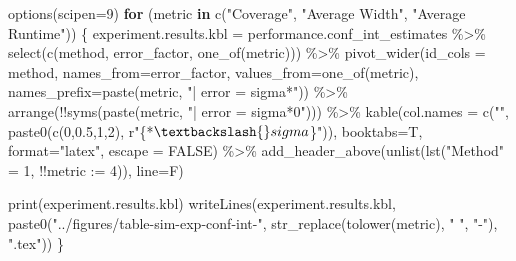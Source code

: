 \documentclass[
]{article}
\newenvironment{Shaded}{\begin{snugshade}}{\end{snugshade}}
\newcommand{\AttributeTok}[1]{\textcolor[rgb]{0.77,0.63,0.00}{#1}}
\newcommand{\ConstantTok}[1]{\textcolor[rgb]{0.00,0.00,0.00}{#1}}
\newcommand{\ControlFlowTok}[1]{\textcolor[rgb]{0.13,0.29,0.53}{\textbf{#1}}}
\newcommand{\DecValTok}[1]{\textcolor[rgb]{0.00,0.00,0.81}{#1}}
\newcommand{\FloatTok}[1]{\textcolor[rgb]{0.00,0.00,0.81}{#1}}
\newcommand{\FunctionTok}[1]{\textcolor[rgb]{0.00,0.00,0.00}{#1}}
\newcommand{\NormalTok}[1]{#1}
\newcommand{\OtherTok}[1]{\textcolor[rgb]{0.56,0.35,0.01}{#1}}
\newcommand{\SpecialCharTok}[1]{\textcolor[rgb]{0.00,0.00,0.00}{#1}}
\newcommand{\StringTok}[1]{\textcolor[rgb]{0.31,0.60,0.02}{#1}}
\begin{document}
\begin{Shaded}
\begin{Highlighting}[]
\FunctionTok{options}\NormalTok{(}\AttributeTok{scipen=}\DecValTok{9}\NormalTok{)}
\ControlFlowTok{for}\NormalTok{ (metric }\ControlFlowTok{in} \FunctionTok{c}\NormalTok{(}\StringTok{"Coverage"}\NormalTok{, }\StringTok{"Average Width"}\NormalTok{, }\StringTok{"Average Runtime"}\NormalTok{)) \{}
\NormalTok{  experiment.results.kbl }\OtherTok{=}\NormalTok{ performance.conf\_int\_estimates }\SpecialCharTok{\%\textgreater{}\%}
    \FunctionTok{select}\NormalTok{(}\FunctionTok{c}\NormalTok{(method, error\_factor, }\FunctionTok{one\_of}\NormalTok{(metric))) }\SpecialCharTok{\%\textgreater{}\%}
    \FunctionTok{pivot\_wider}\NormalTok{(}\AttributeTok{id\_cols =}\NormalTok{ method,}
              \AttributeTok{names\_from=}\NormalTok{error\_factor,}
              \AttributeTok{values\_from=}\FunctionTok{one\_of}\NormalTok{(metric),}
              \AttributeTok{names\_prefix=}\FunctionTok{paste}\NormalTok{(metric, }\StringTok{"| error = sigma*"}\NormalTok{)) }\SpecialCharTok{\%\textgreater{}\%}
    \FunctionTok{arrange}\NormalTok{(}\SpecialCharTok{!!}\FunctionTok{syms}\NormalTok{(}\FunctionTok{paste}\NormalTok{(metric, }\StringTok{"| error = sigma*0"}\NormalTok{))) }\SpecialCharTok{\%\textgreater{}\%}
    \FunctionTok{kable}\NormalTok{(}\AttributeTok{col.names =} \FunctionTok{c}\NormalTok{(}\StringTok{""}\NormalTok{, }\FunctionTok{paste0}\NormalTok{(}\FunctionTok{c}\NormalTok{(}\DecValTok{0}\NormalTok{,}\FloatTok{0.5}\NormalTok{,}\DecValTok{1}\NormalTok{,}\DecValTok{2}\NormalTok{), r}\StringTok{"\{*$\textbackslash{}sigma$\}"}\NormalTok{)), }\AttributeTok{booktabs=}\NormalTok{T, }\AttributeTok{format=}\StringTok{"latex"}\NormalTok{, }\AttributeTok{escape =} \ConstantTok{FALSE}\NormalTok{) }\SpecialCharTok{\%\textgreater{}\%}
    \FunctionTok{add\_header\_above}\NormalTok{(}\FunctionTok{unlist}\NormalTok{(}\FunctionTok{lst}\NormalTok{(}\StringTok{"Method"} \OtherTok{=} \DecValTok{1}\NormalTok{, }\SpecialCharTok{!!}\AttributeTok{metric :=} \DecValTok{4}\NormalTok{)), }\AttributeTok{line=}\NormalTok{F)}
    
  \FunctionTok{print}\NormalTok{(experiment.results.kbl)}
  \FunctionTok{writeLines}\NormalTok{(experiment.results.kbl, }\FunctionTok{paste0}\NormalTok{(}\StringTok{"../figures/table{-}sim{-}exp{-}conf{-}int{-}"}\NormalTok{, }\FunctionTok{str\_replace}\NormalTok{(}\FunctionTok{tolower}\NormalTok{(metric), }\StringTok{" "}\NormalTok{, }\StringTok{"{-}"}\NormalTok{), }\StringTok{".tex"}\NormalTok{))}
\NormalTok{\}}
\end{Highlighting}
\end{Shaded}
\end{document}
